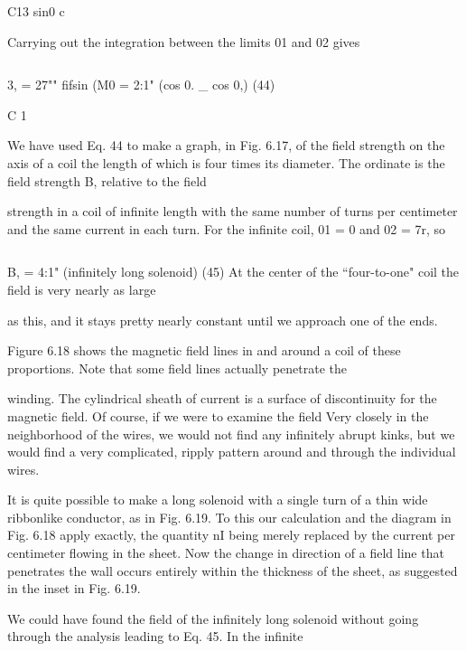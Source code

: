 \begin{equation}
\end{equation}

C13 sin0 c

Carrying out the integration between the limits 01 and 02 gives

\begin{equation}
\end{equation}

3, = 27"" fifsin (M0 = 2:1" (cos 0. _ cos 0,) (44)

C 1

We have used Eq. 44 to make a graph, in Fig. 6.17, of the field
strength on the axis of a coil the length of which is four times its
diameter. The ordinate is the field strength B, relative to the field

 

strength in a coil of infinite length with the same number of turns
per centimeter and the same current in each turn. For the infinite
coil, 01 = 0 and 02 = 7r, so

\begin{equation}
\end{equation}

B, = 4:1" (infinitely long solenoid) (45)
At the center of the ``four-to-one" coil the field is very nearly as large

as this, and it stays pretty nearly constant until we approach one of
the ends.

Figure 6.18 shows the magnetic field lines in and around a coil of
these proportions. Note that some field lines actually penetrate the

winding. The cylindrical sheath of current is a surface of discontinuity
for the magnetic field. Of course, if we were to examine the
field Very closely in the neighborhood of the wires, we would not find
any infinitely abrupt kinks, but we would find a very complicated,
ripply pattern around and through the individual wires.

It is quite possible to make a long solenoid with a single turn of a
thin wide ribbonlike conductor, as in Fig. 6.19. To this our calculation
and the diagram in Fig. 6.18 apply exactly, the quantity nI being
merely replaced by the current per centimeter flowing in the sheet.
Now the change in direction of a field line that penetrates the wall
occurs entirely within the thickness of the sheet, as suggested in the
inset in Fig. 6.19.

We could have found the field of the infinitely long solenoid without
going through the analysis leading to Eq. 45. In the infinite

